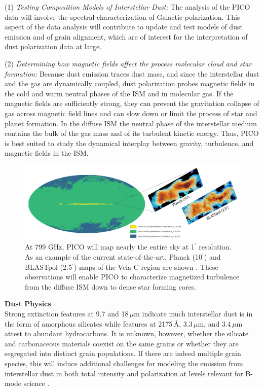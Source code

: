 \documentclass[PICOReport.tex]{subfiles}
\begin{document}
(1) {\em Testing Composition Models of Interstellar Dust:}
The analysis of the PICO data will involve the spectral characterization of Galactic polarization. 
This aspect of the data analysis will contribute to update and test models of dust emission and of grain alignment, which are of interest for 
the interpretation of dust polarization data at large.


(2) {\em Determining how magnetic fields affect the process molecular cloud and star formation:}
Because dust emission traces dust mass, and since the interstellar dust and the 
gas are dynamically coupled, dust polarization probes magnetic fields in 
the cold and warm neutral phases of the ISM and in molecular gas.
If the magnetic fields are sufficiently strong, they can prevent the gravitation collapse of gas across magnetic field lines and can slow down or limit the process of star and planet formation.
In the diffuse ISM the neutral phase of the interstellar medium contains the bulk of the gas mass 
and of its turbulent kinetic energy. Thus, PICO is best suited to study the dynamical interplay between gravity, turbulence, and magnetic fields in the ISM.  


\begin{figure}
    \centering
    \includegraphics[width=6in]{galsci_fig.pdf}
    \caption{At 799 GHz, PICO will map nearly the entire sky at 1$^{\prime}$ resolution. As an example of the current state-of-the-art, Planck (10$^{\prime}$) and BLASTpol (2.5$^{\prime}$) maps of the Vela C region are shown \citep{Fissel2016}. These observations will enable PICO to characterize magnetized turbulence from the diffuse ISM down to dense star forming cores.}
    \label{fig:allsky}
\end{figure}

{\bf Dust Physics}\\
Strong extinction features at 9.7 and 18\,$\mu$m indicate much interstellar dust is in the form of amorphous silicates while features at 2175\,\AA, 3.3\,$\mu$m, and 3.4\,$\mu$m attest to abundant hydrocarbons. It is unknown, however, whether the silicate and carbonaceous materials coexist on the same grains or whether they are segregated into distinct grain populations. If there are indeed multiple grain species, this will induce additional challenges for modeling the emission from interstellar dust in both total intensity and polarization at levels relevant for B-mode science \citep{Hensley2018}.
\end{document}

